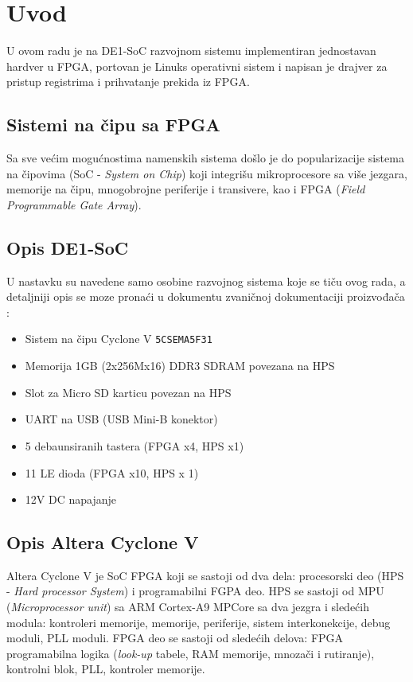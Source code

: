 \section{Uvod}
U ovom radu je na DE1-SoC razvojnom sistemu implementiran jednostavan hardver u FPGA, portovan je Linuks operativni sistem i napisan je drajver za pristup registrima i prihvatanje prekida iz FPGA.

\subsection{Sistemi na čipu sa FPGA}
Sa sve većim mogućnostima namenskih sistema došlo je do popularizacije sistema na čipovima (SoC - \textit{System on Chip}) koji integrišu mikroprocesore sa više jezgara, memorije na čipu, mnogobrojne periferije i transivere, kao i FPGA (\textit{Field Programmable Gate Array}).

\subsection{Opis DE1-SoC}


U nastavku su navedene samo osobine razvojnog sistema koje se tiču ovog rada, a detaljniji opis se moze pronaći u dokumentu zvaničnoj dokumentaciji proizvođača \cite{de1}: 
\begin{itemize}
\item Sistem na čipu Cyclone V \texttt{5CSEMA5F31}
\item Memorija 1GB (2x256Mx16) DDR3 SDRAM povezana na HPS
\item Slot za Micro SD karticu povezan na HPS
\item UART na USB (USB Mini-B konektor)
\item 5 debaunsiranih tastera (FPGA x4, HPS x1)
\item 11 LE dioda (FPGA x10, HPS x 1)
\item 12V DC napajanje
\end{itemize}

\subsection{Opis Altera Cyclone V}
Altera Cyclone V je SoC FPGA koji se sastoji od dva dela: procesorski deo (HPS -  \textit{Hard processor System}) i programabilni FGPA deo. HPS se sastoji od MPU (\textit{Microprocessor unit}) sa ARM Cortex-A9 MPCore sa dva jezgra i sledećih modula: kontroleri memorije, memorije, periferije, sistem interkonekcije, debug moduli, PLL moduli. FPGA deo se sastoji od sledećih delova: FPGA programabilna logika (\textit{look-up} tabele, RAM memorije, mnozači i rutiranje), kontrolni blok, PLL, kontroler memorije.

